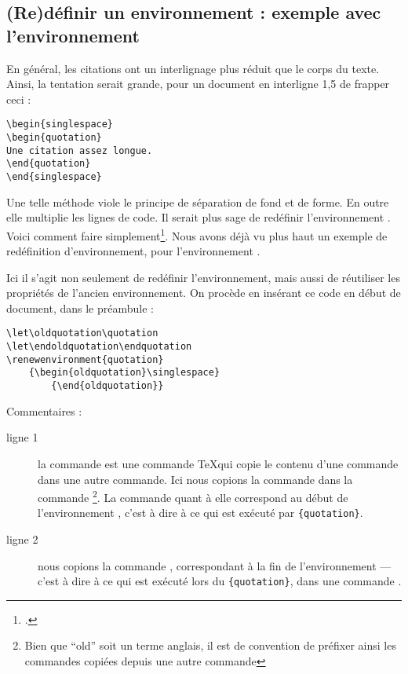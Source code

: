 \subsection[Rédéfinir un environnement : quotation]{(Re)définir un environnement : exemple avec l'environnement }

En général, les citations ont un interlignage plus réduit que le corps du texte. Ainsi, la tentation serait grande, pour un document en interligne 1,5 de frapper ceci :

\begin{verbatim}
\begin{singlespace}
\begin{quotation}
Une citation assez longue.
\end{quotation}
\end{singlespace}
\end{verbatim}

Une telle méthode viole le principe de séparation de fond et de forme. En outre elle multiplie les lignes de code. Il serait plus sage de redéfinir l'environnement . Voici comment faire simplement\footcite[Nous nous somme basés sur la classe  :][]{bredele}. Nous avons déjà vu plus haut un exemple de redéfinition d'environnement, pour l'environnement . 

Ici il s'agit non seulement de redéfinir l'environnement, mais aussi de réutiliser les propriétés de l'ancien environnement. On procède en insérant ce code en début de document, dans le préambule :

\begin{verbatim}
\let\oldquotation\quotation
\let\endoldquotation\endquotation
\renewenvironment{quotation}
	{\begin{oldquotation}\singlespace}
        {\end{oldquotation}}
\end{verbatim}

Commentaires : 

\begin{description}
\item[ligne 1] la commande  est une commande \TeX qui copie le contenu d'une commande dans une autre commande. Ici nous copions la commande  dans la commande \footnote{Bien que \enquote{old} soit un terme anglais, il est de convention de préfixer ainsi les commandes copiées depuis une autre commande}. La commande  quant à elle correspond au début de l'environnement , c'est à dire à ce qui est exécuté par \verb|{quotation}|.
\item[ligne 2] nous copions la commande , correspondant à la fin de l'environnement   --- c'est à dire à ce qui est exécuté lors du \verb|{quotation}|, dans une commande .
\end{description}

